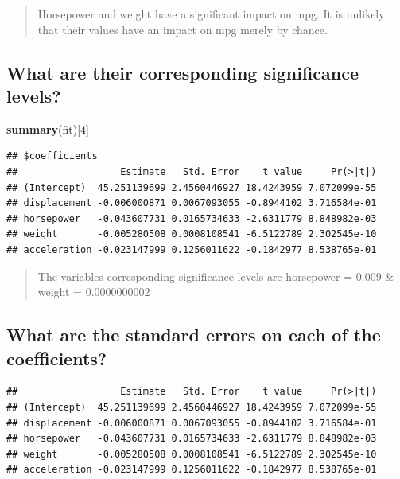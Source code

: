 \documentclass[]{article}
\newenvironment{Shaded}{\begin{snugshade}}{\end{snugshade}}
\newcommand{\KeywordTok}[1]{\textcolor[rgb]{0.13,0.29,0.53}{\textbf{{#1}}}}
\newcommand{\DecValTok}[1]{\textcolor[rgb]{0.00,0.00,0.81}{{#1}}}
\newcommand{\NormalTok}[1]{{#1}}
\begin{document}
\begin{quote}
Horsepower and weight have a significant impact on mpg. It is unlikely
that their values have an impact on mpg merely by chance.
\end{quote}

\subsection{What are their corresponding significance
levels?}\label{what-are-their-corresponding-significance-levels}

\begin{Shaded}
\begin{Highlighting}[]
\KeywordTok{summary}\NormalTok{(fit)[}\DecValTok{4}\NormalTok{]}
\end{Highlighting}
\end{Shaded}

\begin{verbatim}
## $coefficients
##                  Estimate   Std. Error    t value     Pr(>|t|)
## (Intercept)  45.251139699 2.4560446927 18.4243959 7.072099e-55
## displacement -0.006000871 0.0067093055 -0.8944102 3.716584e-01
## horsepower   -0.043607731 0.0165734633 -2.6311779 8.848982e-03
## weight       -0.005280508 0.0008108541 -6.5122789 2.302545e-10
## acceleration -0.023147999 0.1256011622 -0.1842977 8.538765e-01
\end{verbatim}

\begin{quote}
The variables corresponding significance levels are horsepower =
\(0.009\) \& weight = \(0.0000000002\)
\end{quote}

\subsection{What are the standard errors on each of the
coefficients?}\label{what-are-the-standard-errors-on-each-of-the-coefficients}

\begin{Shaded}
\end{Shaded}

\begin{verbatim}
##                  Estimate   Std. Error    t value     Pr(>|t|)
## (Intercept)  45.251139699 2.4560446927 18.4243959 7.072099e-55
## displacement -0.006000871 0.0067093055 -0.8944102 3.716584e-01
## horsepower   -0.043607731 0.0165734633 -2.6311779 8.848982e-03
## weight       -0.005280508 0.0008108541 -6.5122789 2.302545e-10
## acceleration -0.023147999 0.1256011622 -0.1842977 8.538765e-01
\end{verbatim}
\end{document}
